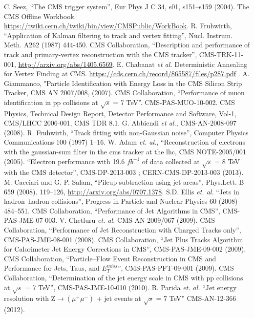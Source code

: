 \begin{thebibliography}{99}
 C. Seez, ``The CMS trigger system'', Eur Phys J C 34, s01, s151–s159 (2004).
 The CMS Offline Workbook. {\url{https://twiki.cern.ch/twiki/bin/view/CMSPublic/WorkBook}}.
 R. Fruhwirth, ``Application of Kalman filtering to track and vertex fitting'', Nucl. Instrum. Meth. A262 (1987) 444-450.
 CMS Collaboration, ``Description and performance of track and primary-vertex reconstruction with the CMS tracker'', CMS-TRK-11-001, \url{http://arxiv.org/abs/1405.6569}.
 E. Chabanat {\it et al.} Deterministic Annealing for Vertex Finding at CMS. {\url{https://cds.cern.ch/record/865587/files/p287.pdf}} .
 A. Giammanco, "Particle Identification with Energy Loss in the
CMS Silicon Strip Tracker, CMS AN 2007/008, (2007).
 CMS Collaboration, ``Performance of muon identiﬁcation in pp collisions at $\sqrt {s}$ = 7 TeV''. CMS-PAS-MUO-10-002.
 CMS Physics, Technical Design Report, Detector Performance and Software, Vol-1, CMS/LHCC 2006-001, CMS TDR 8.1.
 G. Abbiendi {\it et al.}, CMS-AN-2008-097 (2008).
 R. Fruhwirth, ``Track fitting with non-Gaussian noise'', Computer Physics Communications 100 (1997) 1–16. 
 W. Adam {\it et. al.}, ``Reconstruction of electrons with the gaussian-sum filter in the cms tracker at the lhc, CMS NOTE-2005/001 (2005).
 ``Electron performance with 19.6 $fb^{-1}$ of data collected at $\sqrt {s} $ = 8 TeV with the CMS detector'', CMS-DP-2013-003 ; CERN-CMS-DP-2013-003 (2013).
 M. Cacciari and G. P. Salam, ``Pileup subtraction using jet areas'', Phys.Lett. B 659 (2008).
119–126, \url{http://arxiv.org/abs/0707.1378}.
 S.D. Ellis {\it et. al.} ``Jets in hadron–hadron collisions'', Progress in Particle and Nuclear Physics 60 (2008) 484–551.
 CMS Collaboration, ``Performance of Jet Algorithms in CMS'', CMS-PAS-JME-07-003.
 V. Chetluru {\it et. al.} CMS-AN-2009/067 (2009).
 CMS Collaboration, ``Performance of Jet Reconstruction with Charged Tracks only'', CMS-PAS-JME-08-001 (2008).
 CMS Collaboration, ``Jet Plus Tracks Algorithm for Calorimeter Jet Energy Corrections in CMS'', CMS-PAS-JME-09-002 (2009).
 CMS Collaboration, ``Particle–Flow Event Reconstruction in CMS and Performance for Jets, Taus, and $E_T^{miss}$'', CMS-PAS-PFT-09-001 (2009).
 CMS Collaboration, ``Determination of the jet energy scale in CMS with pp collisions at $\sqrt {s}$ = 7 TeV'', CMS-PAS-JME-10-010 (2010).
 B. Parida {\it et. al.} ``Jet energy resolution with Z$\rightarrow(\mu^+\mu^-)$ + jet events at $\sqrt {s}$ = 7 TeV'' CMS-AN-12-366 (2012).


\end{thebibliography}
